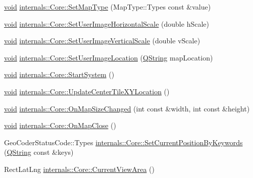 \begin{DoxyCompactItemize}
\item 
\hyperlink{group___u_a_v_objects_plugin_ga444cf2ff3f0ecbe028adce838d373f5c}{void} \hyperlink{group___o_p_map_widget_ga5d71e20762c9714191db9f74f3dd3b6a}{internals\-::\-Core\-::\-Set\-Map\-Type} (\-Map\-Type\-::\-Types const \&value)
\item 
\hyperlink{group___u_a_v_objects_plugin_ga444cf2ff3f0ecbe028adce838d373f5c}{void} \hyperlink{group___o_p_map_widget_ga597dd716558e9c45baa91de591f4ce07}{internals\-::\-Core\-::\-Set\-User\-Image\-Horizontal\-Scale} (double h\-Scale)
\item 
\hyperlink{group___u_a_v_objects_plugin_ga444cf2ff3f0ecbe028adce838d373f5c}{void} \hyperlink{group___o_p_map_widget_gae296cd09fb96cfeadbe202f9cba7e1fd}{internals\-::\-Core\-::\-Set\-User\-Image\-Vertical\-Scale} (double v\-Scale)
\item 
\hyperlink{group___u_a_v_objects_plugin_ga444cf2ff3f0ecbe028adce838d373f5c}{void} \hyperlink{group___o_p_map_widget_gafe136669e790fac1607a72f7bfca9510}{internals\-::\-Core\-::\-Set\-User\-Image\-Location} (\hyperlink{group___u_a_v_objects_plugin_gab9d252f49c333c94a72f97ce3105a32d}{\-Q\-String} map\-Location)
\item 
\hyperlink{group___u_a_v_objects_plugin_ga444cf2ff3f0ecbe028adce838d373f5c}{void} \hyperlink{group___o_p_map_widget_gacc5971a73e9ba3ed87d97bf76e2c2e51}{internals\-::\-Core\-::\-Start\-System} ()
\item 
\hyperlink{group___u_a_v_objects_plugin_ga444cf2ff3f0ecbe028adce838d373f5c}{void} \hyperlink{group___o_p_map_widget_ga1c516d5c141339ebb623bd521e20edb6}{internals\-::\-Core\-::\-Update\-Center\-Tile\-X\-Y\-Location} ()
\item 
\hyperlink{group___u_a_v_objects_plugin_ga444cf2ff3f0ecbe028adce838d373f5c}{void} \hyperlink{group___o_p_map_widget_ga32b946b66a00213f725727696df9d9b4}{internals\-::\-Core\-::\-On\-Map\-Size\-Changed} (int const \&width, int const \&height)
\item 
\hyperlink{group___u_a_v_objects_plugin_ga444cf2ff3f0ecbe028adce838d373f5c}{void} \hyperlink{group___o_p_map_widget_ga10820264fc94dee4c279f60f6ed02309}{internals\-::\-Core\-::\-On\-Map\-Close} ()
\item 
\-Geo\-Coder\-Status\-Code\-::\-Types \hyperlink{group___o_p_map_widget_ga6fbdb5c07fae2a4400184e0c621ad750}{internals\-::\-Core\-::\-Set\-Current\-Position\-By\-Keywords} (\hyperlink{group___u_a_v_objects_plugin_gab9d252f49c333c94a72f97ce3105a32d}{\-Q\-String} const \&keys)
\item 
\-Rect\-Lat\-Lng \hyperlink{group___o_p_map_widget_ga228af41d307f46e0d759a52f0305d39a}{internals\-::\-Core\-::\-Current\-View\-Area} ()

\end{DoxyCompactItemize}
